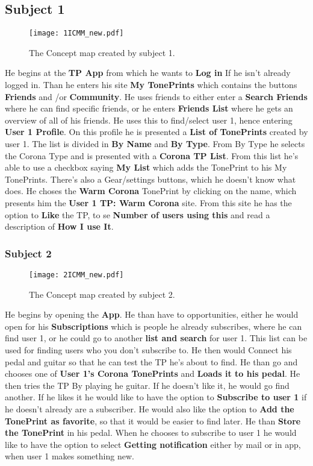 \subsection*{Subject 1}
\label{Subject1ICMM}

\begin{figure}[H]
	\centering
	\texttt{[image: 1ICMM\_new.pdf]}
	\caption{The Concept map created by subject 1.}
	\label{fig:ICMM1}
\end{figure}

He begins at the \textbf{TP App} from which he wants to \textbf{Log in} If he isn’t already logged in. Than he enters his site \textbf{My TonePrints} which contains the buttons \textbf{Friends} and /or \textbf{Community}. He uses friends to either enter a \textbf{Search Friends} where he can find specific friends, or he enters \textbf{Friends List} where he gets an overview of all of his friends. He uses this to find/select user 1, hence entering \textbf{User 1 Profile}. On this profile he is presented a \textbf{List of TonePrints} created by user 1. The list is divided in \textbf{By Name} and \textbf{By Type}. From By Type he selects the Corona Type and is presented with a \textbf{Corona TP List}. From this list he’s able to use a checkbox saying \textbf{My List} which adds the TonePrint to his My TonePrints. There’s also a Gear/settings buttons, which he doesn’t know what does. He choses the \textbf{Warm Corona} TonePrint by clicking on the name, which presents him the \textbf{User 1 TP: Warm Corona} site. From this site he has the option to \textbf{Like} the TP, to se \textbf{Number of users using this} and read a description of \textbf{How I use It}.


\subsubsection{Subject 2}
\label{Subject2ICMM}
\begin{figure}[H]
	\centering
	\texttt{[image: 2ICMM\_new.pdf]}
	\caption{The Concept map created by subject 2.}
	\label{fig:ICMM2}
\end{figure}

He begins by opening the \textbf{App}. He than have to opportunities, either he would open for his \textbf{Subscriptions} which is people he already subscribes, where he can find user 1, or he could go to another \textbf{list and search} for user 1. This list can be used for finding users who you don’t subscribe to. He then would Connect his pedal and guitar so that he can test the TP he’s about to find. He than go and chooses one of \textbf{User 1's Corona TonePrints} and \textbf{Loads it to his pedal}. He then tries the TP By playing he guitar. If he doesn’t like it, he would go find another. If he likes it he would like to have the option to \textbf{Subscribe to user 1} if he doesn’t already are a subscriber. He would also like the option to \textbf{Add the TonePrint as favorite}, so that it would be easier to find later. He than \textbf{Store the TonePrint} in his pedal. When he chooses to subscribe to user 1 he would like to have the option to select \textbf{Getting notification} either by mail or in app, when user 1 makes something new.

